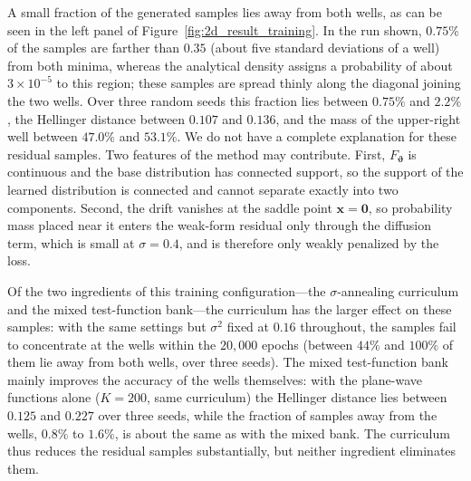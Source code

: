 \documentclass[11pt,a4paper]{article}
\renewcommand{\mathbf}[1]{\boldsymbol{#1}}
\newcommand{\revthree}[1]{\textcolor{revthreecolor}{#1}}
\begin{document}
\revthree{A small fraction of the generated samples lies away from both wells, as can be seen in the left panel of Figure~\ref{fig:2d_result_training}. In the run shown, $0.75\%$ of the samples are farther than $0.35$ (about five standard deviations of a well) from both minima, whereas the analytical density assigns a probability of about $3\times10^{-5}$ to this region; these samples are spread thinly along the diagonal joining the two wells. Over three random seeds this fraction lies between $0.75\%$ and $2.2\%$, the Hellinger distance between $0.107$ and $0.136$, and the mass of the upper-right well between $47.0\%$ and $53.1\%$. We do not have a complete explanation for these residual samples. Two features of the method may contribute. First, $F_{\boldsymbol{\vartheta}}$ is continuous and the base distribution has connected support, so the support of the learned distribution is connected and cannot separate exactly into two components. Second, the drift vanishes at the saddle point $\mathbf{x}=\mathbf{0}$, so probability mass placed near it enters the weak-form residual only through the diffusion term, which is small at $\sigma=0.4$, and is therefore only weakly penalized by the loss.}

\revthree{Of the two ingredients of this training configuration---the $\sigma$-annealing curriculum and the mixed test-function bank---the curriculum has the larger effect on these samples: with the same settings but $\sigma^2$ fixed at $0.16$ throughout, the samples fail to concentrate at the wells within the $20{,}000$ epochs (between $44\%$ and $100\%$ of them lie away from both wells, over three seeds). The mixed test-function bank mainly improves the accuracy of the wells themselves: with the plane-wave functions alone ($K=200$, same curriculum) the Hellinger distance lies between $0.125$ and $0.227$ over three seeds, while the fraction of samples away from the wells, $0.8\%$ to $1.6\%$, is about the same as with the mixed bank. The curriculum thus reduces the residual samples substantially, but neither ingredient eliminates them.}
\end{document}
